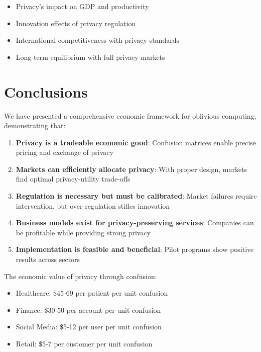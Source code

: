 \documentclass[11pt,final]{article}
\begin{document}
\begin{itemize}
    \item Privacy's impact on GDP and productivity
    \item Innovation effects of privacy regulation
    \item International competitiveness with privacy standards
    \item Long-term equilibrium with full privacy markets
\end{itemize}

\section{Conclusions}

We have presented a comprehensive economic framework for oblivious computing, demonstrating that:

\begin{enumerate}
    \item \textbf{Privacy is a tradeable economic good}: Confusion matrices enable precise pricing and exchange of privacy
    
    \item \textbf{Markets can efficiently allocate privacy}: With proper design, markets find optimal privacy-utility trade-offs
    
    \item \textbf{Regulation is necessary but must be calibrated}: Market failures require intervention, but over-regulation stifles innovation
    
    \item \textbf{Business models exist for privacy-preserving services}: Companies can be profitable while providing strong privacy
    
    \item \textbf{Implementation is feasible and beneficial}: Pilot programs show positive results across sectors
\end{enumerate}

The economic value of privacy through confusion:
\begin{itemize}
    \item Healthcare: \$45-69 per patient per unit confusion
    \item Finance: \$30-50 per account per unit confusion  
    \item Social Media: \$5-12 per user per unit confusion
    \item Retail: \$5-7 per customer per unit confusion
\end{itemize}
\end{document}
